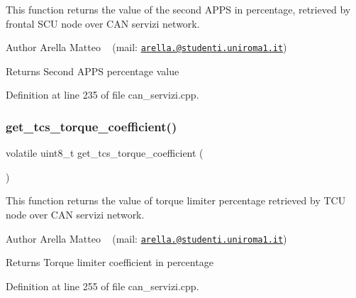 This function returns the value of the second A\+P\+PS in percentage, retrieved by frontal S\+CU node over C\+AN servizi network. 

\begin{DoxyAuthor}{Author}
Arella Matteo ~\newline
 (mail\+: \href{mailto:arella.1646983@studenti.uniroma1.it}{\tt arella.@studenti.\+uniroma1.\+it})
\end{DoxyAuthor}
\begin{DoxyReturn}{Returns}
Second A\+P\+PS percentage value 
\end{DoxyReturn}


Definition at line 235 of file can\+\_\+servizi.\+cpp.

\mbox{\label{group___c_a_n__servizi__group_ga68bca94de95a77a3366f46eed661193f}} 
\subsubsection{\texorpdfstring{get\+\_\+tcs\+\_\+torque\+\_\+coefficient()}{get\_tcs\_torque\_coefficient()}}
{\footnotesize\ttfamily volatile uint8\+\_\+t get\+\_\+tcs\+\_\+torque\+\_\+coefficient (\begin{DoxyParamCaption}{ }\end{DoxyParamCaption})}



This function returns the value of torque limiter percentage retrieved by T\+CU node over C\+AN servizi network. 

\begin{DoxyAuthor}{Author}
Arella Matteo ~\newline
 (mail\+: \href{mailto:arella.1646983@studenti.uniroma1.it}{\tt arella.@studenti.\+uniroma1.\+it})
\end{DoxyAuthor}
\begin{DoxyReturn}{Returns}
Torque limiter coefficient in percentage 
\end{DoxyReturn}


Definition at line 255 of file can\+\_\+servizi.\+cpp.

\mbox{\label{group___c_a_n__servizi__group_ga0c5f72386ae62e3e0b6908efa2fb2b28}} 
